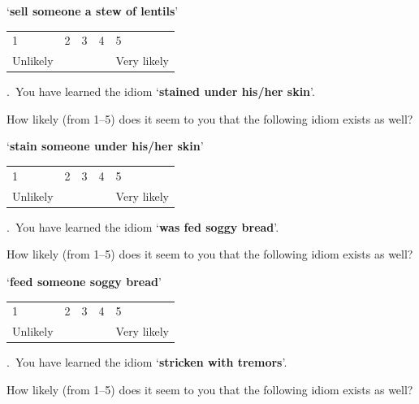 \documentclass[output=paper]{langsci/langscibook}
\begin{document}
\begin{paperappendix}
{\noindent \enquote*{\textbf{sell someone a stew of lentils}}\vspace{.5\baselineskip}

\noindent \begin{tabularx}{\textwidth}{XXXXX}
        1 & 2 & 3 & 4 & 5\\
        Unlikely & & & & Very likely\\
        \end{tabularx}\vspace{1\baselineskip}


.\ You have learned the idiom \enquote*{\textbf{stained under his/her
    skin}}.

\noindent How likely (from 1--5) does it seem to you that the following idiom exists
    as well?\vspace{.5\baselineskip}

\noindent \enquote*{\textbf{stain someone under his/her skin}}\vspace{.5\baselineskip}

\noindent \begin{tabularx}{\textwidth}{XXXXX}
        1 & 2 & 3 & 4 & 5\\
        Unlikely & & & & Very likely\\
        \end{tabularx}\vspace{1\baselineskip}


.\ You have learned the idiom \enquote*{\textbf{was fed soggy bread}}.

\noindent How likely (from 1--5) does it seem to you that the following idiom exists
    as well?\vspace{.5\baselineskip}

\noindent \enquote*{\textbf{feed someone soggy bread}}\vspace{.5\baselineskip}

\noindent \begin{tabularx}{\textwidth}{XXXXX}
        1 & 2 & 3 & 4 & 5\\
        Unlikely & & & & Very likely\\
        \end{tabularx}\vspace{1\baselineskip}


.\ You have learned the idiom \enquote*{\textbf{stricken with tremors}}.

\noindent How likely (from 1--5) does it seem to you that the following idiom exists
    as well?\vspace{.5\baselineskip}

}
\end{paperappendix}
\end{document}
